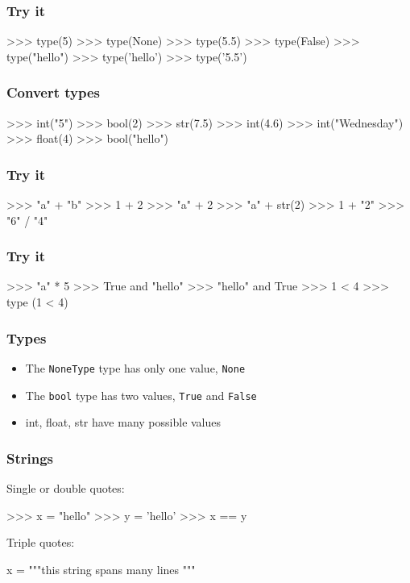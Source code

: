 \documentclass{beamer}
\begin{document}
\begin{frame}[fragile]
\frametitle{Try it}
\begin{code}
>>> type(5)
>>> type(None)
>>> type(5.5)
>>> type(False)
>>> type("hello")
>>> type('hello')
>>> type('5.5')
\end{code}
\end{frame}

\begin{frame}[fragile]
\frametitle{Convert types}
\begin{code}
>>> int("5")
>>> bool(2)
>>> str(7.5)
>>> int(4.6)
>>> int("Wednesday")
>>> float(4)
>>> bool("hello")
\end{code}
\end{frame}


\begin{frame}[fragile]
\frametitle{Try it}
\begin{code}
>>> "a" + "b"
>>> 1 + 2
>>> "a" + 2
>>> "a" + str(2)
>>> 1 + "2"
>>> "6" / "4"
\end{code}
\end{frame}

\begin{frame}[fragile]
\frametitle{Try it}
\begin{code}
>>> "a" * 5
>>> True and "hello"
>>> "hello" and True
>>> 1 < 4
>>> type (1 < 4)
\end{code}
\end{frame}

\begin{frame}
\frametitle{Types}
\begin{itemize}
\item The {\tt NoneType} type has only one value, {\tt None}
\item The {\tt bool} type has two values, {\tt True} and {\tt False}
\item int, float, str have many possible values
\end{itemize}
\end{frame}

\begin{frame}[fragile]
\frametitle{Strings}
Single or double quotes: 
\begin{code}
>>> x = "hello"
>>> y = 'hello'
>>> x == y
\end{code}

Triple quotes:
\begin{code}
x = """this string
spans many
lines
"""
\end{code}
\end{frame}
\end{document}
